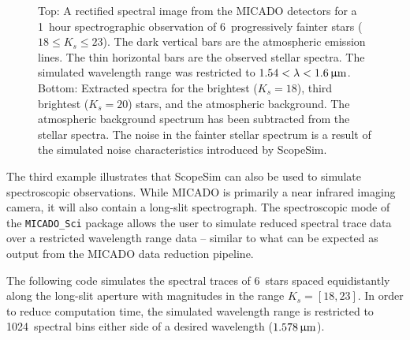 \begin{figure}
\begin{center}
\label{fig:example-3-spectra}
\caption{Top: A rectified spectral image from the MICADO detectors for a 1~hour spectrographic observation of 6~progressively fainter stars ($18\leq K_s\leq 23$).
The dark vertical bars are the atmospheric emission lines.
The thin horizontal bars are the observed stellar spectra.
The simulated wavelength range was restricted to $1.54<\lambda<1.6\,\upmu\mathrm{m}$.
Bottom: Extracted spectra for the brightest ($K_s=18$), third brightest ($K_s=20$) stars, and the atmospheric background.
The atmospheric background spectrum has been subtracted from the stellar spectra.
The noise in the fainter stellar spectrum is a result of the simulated noise characteristics introduced by ScopeSim.}
\end{center}
\end{figure}

The third example illustrates that ScopeSim can also be used to simulate spectroscopic observations.
While MICADO is primarily a near infrared imaging camera, it will also contain a long-slit spectrograph.
The spectroscopic mode of the \lstinline{MICADO_Sci} package allows the user to simulate reduced spectral trace data over a restricted wavelength range data -- similar to what can be expected as output from the MICADO data reduction pipeline.

The following code simulates the spectral traces of 6~stars spaced equidistantly along the long-slit aperture with magnitudes in the range $K_s=[18, 23]$.
In order to reduce computation time, the simulated wavelength range is restricted to 1024~spectral bins either side of a desired wavelength ($1.578\,\upmu\mathrm{m}$).

